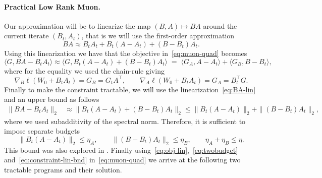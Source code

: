 \paragraph{Practical Low Rank Muon.}
Our  approximation will be to linearize the map \((B,A) \mapsto BA\) around the current iterate \((B_t,A_t)\), that is we will use the first-order approximation 
\begin{equation} \label{eq:BA-lin}
BA
\approx
B_tA_t
+
B_t(A-A_t)
+
(B-B_t)A_t.
\end{equation}
Using this linearization we have that the objective in~\eqref{eq:muon-quad} becomes
\begin{equation}\label{eq:obj-lin}
    \langle G, BA -B_tA_t\rangle \approx 
\langle G, B_t(A-A_t)
+
(B-B_t)A_t\rangle \; =\;  
\langle G_A,A-A_t \rangle
+
\langle G_B, B-B_t\rangle,
\end{equation} 
where for the equality we used  the chain-rule giving
  \[
  \nabla_B \ell(W_0+B_tA_t) = G_B = G_t A^\top,
  \qquad
  \nabla_A \ell(W_0+B_tA_t) = G_A = B_t^\top G .
  \]
Finally to make the constraint tractable, we will use the linearization~\eqref{eq:BA-lin} and an upper bound as follows
\begin{align} \label{eq:constraint-lin-bnd}
    \|BA - B_tA_t\|_2 & \approx 
    \|B_t(A-A_t)
+
(B-B_t)A_t\|_2 \leq     \|B_t(A-A_t)\|_2
+
\|(B-B_t)A_t\|_2,
\end{align}
where we used subadditivity of the spectral norm. 
Therefore, it is sufficient to impose separate budgets 
\begin{equation} \label{eq:twobudget} 
\|B_t(A-A_t)\|_2 \leq \eta_A,
\qquad
\|(B-B_t)A_t\|_2 \leq \eta_B,
\qquad
\eta_A+\eta_B \leq \eta.
\end{equation}
This bound was also explored in  \cite{tilde_csd}.
Finally using~\eqref{eq:obj-lin},~\eqref{eq:twobudget} and~\eqref{eq:constraint-lin-bnd} in~\eqref{eq:muon-quad} we arrive at the following two tractable programs and their solution.


